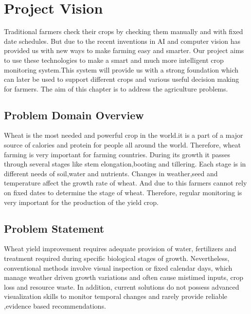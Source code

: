 \documentclass{FastFyp}
\begin{document}
 
\chapter{Project Vision}
Traditional farmers check their crops by checking them manually and with fixed date schedules. But due to the recent inventions in AI and computer vision has provided us with new ways to make farming easy and smarter. Our project aims to use these technologies to make a smart and much more intelligent crop monitoring system.This system will provide us with a strong foundation which can later be used to support different crops and various useful decision making for farmers. The aim of this chapter is to address the agriculture problems. 
\section{Problem Domain Overview}
Wheat is the most needed and powerful crop in the world.it is a part of a major source of calories and protein for people all around the world. Therefore, wheat farming is very important for farming countries. During its growth it passes through several stages like stem elongation,booting and tillering. Each stage is in different needs of soil,water and nutrients. Changes in weather,seed and temperature affect the growth rate of wheat. And due to this farmers cannot rely on fixed dates to determine the stage of wheat. Therefore, regular monitoring is very important for the production of the yield crop. 
\section{Problem Statement}
Wheat yield improvement requires adequate provision of water, fertilizers and treatment required during specific biological stages of growth. Nevertheless, conventional methods involve visual inspection or fixed calendar days, which manage weather driven growth variations and often cause mistimed inputs, crop loss and resource waste. In addition, current solutions do not possess advanced visualization skills to monitor temporal changes and rarely provide reliable ,evidence based recommendations.   
\end{document}
